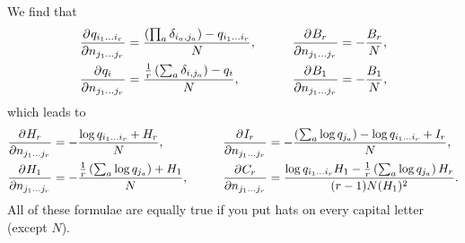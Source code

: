 \documentclass[12pt]{article}
\begin{document}
We find that
%
\begin{equation}\label{eq:dqbydn}
  \begin{aligned}
    \pdiff{q_{i_1\ldots i_r}}{n_{j_1\ldots j_r}} &= \frac{\prn{\prod_a \delta_{i_a,j_a}} - q_{i_1\ldots i_r}}{N}, &
    \qquad
    \pdiff{B_{r}}{n_{j_1\ldots j_r}} &= -\frac{B_r}{N},\\
    \pdiff{q_{i}}{n_{j_1\ldots j_r}} &= \frac{\frac{1}{r} \prn{\sum_a \delta_{i,j_a}} - q_{i}}{N}, &
    \pdiff{B_{1}}{n_{j_1\ldots j_r}} &= -\frac{B_1}{N},
   \end{aligned}
\end{equation}
%
which leads to
%
\begin{equation}\label{eq:dhbydn}
  \begin{aligned}
    \pdiff{H_r}{n_{j_1\ldots j_r}} &= -\frac{\log q_{i_1\ldots i_r} + H_r}{N}, &
    \qquad
    \pdiff{I_{r}}{n_{j_1\ldots j_r}} &= -\frac{\prn{\sum_a \log q_{j_a}}-\log q_{i_1\ldots i_r} + I_r}{N}, \\
    \pdiff{H_1}{n_{j_1\ldots j_r}} &= -\frac{\frac{1}{r} \prn{\sum_a \log q_{j_a}} + H_1}{N}, &
    \pdiff{C_{r}}{n_{j_1\ldots j_r}} &= \frac{\log q_{i_1\ldots i_r} H_1 - \frac{1}{r} \prn{\sum_a \log q_{j_a}} H_r}{(r-1)N(H_1)^2}.
   \end{aligned}
\end{equation}
%
All of these formulae are equally true if you put hats on every capital letter (except $N$).













\end{document}
